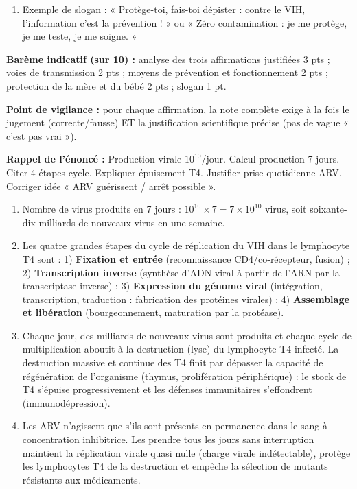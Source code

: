 \documentclass[11pt]{article}
\newcommand{\cle}[1]{{\popxbold\color{popdark}#1}}
\begin{document}
\begin{corrige}
\begin{enumerate}
\item Exemple de slogan : « Protège-toi, fais-toi dépister : contre le VIH, l'information c'est la prévention ! » ou « Zéro contamination : je me protège, je me teste, je me soigne. »
\end{enumerate}
\textbf{Barème indicatif (sur 10) :} analyse des trois affirmations justifiées 3 pts ; voies de transmission 2 pts ; moyens de prévention et fonctionnement 2 pts ; protection de la mère et du bébé 2 pts ; slogan 1 pt.

\textbf{Point de vigilance :} pour chaque affirmation, la note complète exige à la fois le jugement (correcte/fausse) ET la justification scientifique précise (pas de vague « c'est pas vrai »).
\end{corrige}

\begin{corrige}
\textbf{Rappel de l'énoncé :} Production virale $10^{10}$/jour. Calcul production 7 jours. Citer 4 étapes cycle. Expliquer épuisement T4. Justifier prise quotidienne ARV. Corriger idée « ARV guérissent / arrêt possible ».
\tcblower
\begin{enumerate}
\item Nombre de virus produits en 7 jours : $10^{10} \times 7 = 7 \times 10^{10}$ virus, soit soixante-dix milliards de nouveaux virus en une semaine.
\item Les quatre grandes étapes du cycle de réplication du VIH dans le lymphocyte T4 sont : 1) \textbf{Fixation et entrée} (reconnaissance CD4/co-récepteur, fusion) ; 2) \textbf{Transcription inverse} (synthèse d'ADN viral à partir de l'ARN par la transcriptase inverse) ; 3) \textbf{Expression du génome viral} (intégration, transcription, traduction : fabrication des protéines virales) ; 4) \textbf{Assemblage et libération} (bourgeonnement, maturation par la protéase).
\item Chaque jour, des milliards de nouveaux virus sont produits et chaque cycle de multiplication aboutit à la destruction (lyse) du lymphocyte T4 infecté. La destruction massive et continue des T4 finit par dépasser la capacité de régénération de l'organisme (thymus, prolifération périphérique) : le stock de T4 s'épuise progressivement et les défenses immunitaires s'effondrent (immunodépression).
\item Les ARV n'agissent que s'ils sont présents en permanence dans le sang à concentration inhibitrice. Les prendre tous les jours sans interruption maintient la réplication virale quasi nulle (charge virale indétectable), protège les lymphocytes T4 de la destruction et empêche la sélection de mutants \cle{résistants} aux médicaments.

\end{enumerate}
\end{corrige}
\end{document}
